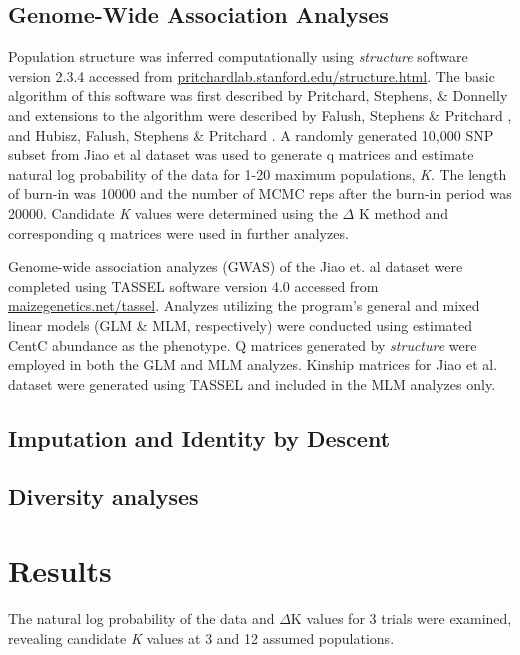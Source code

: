 \documentclass[12pt]{article}
\begin{document}
\subsection{Genome-Wide Association Analyses} %
Population structure was inferred computationally using \emph{structure} software version 2.3.4 accessed from \url{pritchardlab.stanford.edu/structure.html}.  The basic algorithm of this software was first described by Pritchard, Stephens, \& Donnelly \cite{Pritchard2000} and extensions to the algorithm were described by Falush, Stephens \& Pritchard \cite{Falush2003}, \cite{Falush2007} and Hubisz, Falush, Stephens \& Pritchard \cite{Hubisz2009}. A randomly generated 10,000 SNP subset from Jiao et al dataset was used to generate q matrices and estimate natural log probability of the data for 1-20 maximum populations, \emph{K}.  The length of burn-in was 10000 and the number of MCMC reps after the burn-in period was 20000.  Candidate \emph{K} values were determined using the $\Delta$ K method and corresponding q matrices were used in further analyzes.    

Genome-wide association analyzes (GWAS) of the Jiao et. al dataset were completed using TASSEL software version 4.0 accessed from \url{maizegenetics.net/tassel}.  Analyzes utilizing the program's general and mixed linear models (GLM \& MLM, respectively) were conducted using estimated CentC abundance as the phenotype.  Q matrices generated by \emph{structure} were employed in both the GLM and MLM analyzes.  Kinship matrices for Jiao et al. dataset were generated using TASSEL and included in the MLM analyzes only.    
\subsection{Imputation and Identity by Descent} %


\subsection{Diversity analyses} %


\section{Results}

The natural log probability of the data and  $\Delta$K values for 3 trials were examined, revealing candidate \emph{K} values at 3 and 12 assumed populations.    
\end{document}
